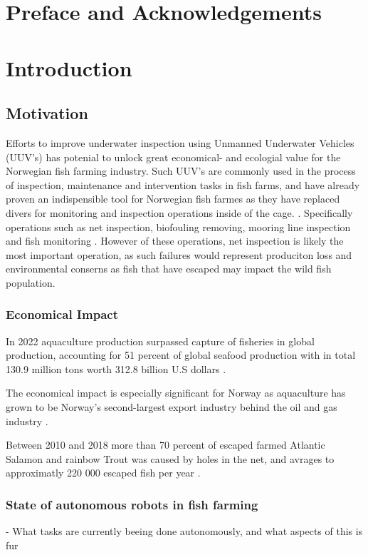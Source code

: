 \section{Preface and Acknowledgements}
\section{Introduction}

\subsection{Motivation}

Efforts to improve underwater inspection using Unmanned Underwater Vehicles (UUV's) has potenial to unlock great economical- and ecologial value for the Norwegian fish farming industry.  Such UUV's are commonly used in the process of inspection, maintenance and intervention tasks in fish farms, and have already proven an indispensible tool for Norwegian fish farmes as they have replaced divers for monitoring and inspection operations inside of the cage.  \cite{amundsen2024aquaculture}. Specifically operations such as net inspection, biofouling removing, mooring line inspection and fish monitoring \cite{amundsen2025netpen}. However of these operations, net inspection is likely the most important operation, as such failures would represent produciton loss and environmental conserns as fish that have escaped may impact the wild fish population.


\subsubsection{Economical Impact}
In 2022 aquaculture production surpassed capture of fisheries in global production, accounting for 51 percent of global seafood production with in total 130.9 million tons worth 312.8 billion U.S dollars \cite{amundsen2025netpen}.

The economical impact is especially significant for Norway as aquaculture has grown to be Norway's second-largest export industry behind the oil and gas industry \cite{amundsen2024aquaculture}.

Between 2010 and 2018 more than 70 percent of escaped farmed Atlantic Salamon and rainbow Trout was caused by holes in the net, and avrages to approximatly 220 000 escaped fish per year \cite{evjemo2025aquaculture}. 

\subsubsection{State of autonomous robots in fish farming}
- What tasks are currently beeing done autonomously, and what aspects of this is fur

